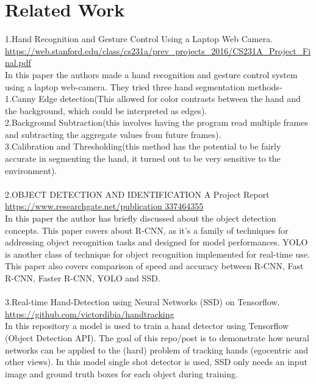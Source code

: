 \documentclass[12pt]{article}
\begin{document}
\section{Related Work}
1.Hand Recognition and Gesture Control Using a Laptop Web Camera.\\
\url{https://web.stanford.edu/class/cs231a/prev_projects_2016/CS231A_Project_Final.pdf}\\
In this paper the authors made a hand recognition and gesture control system using a laptop web-camera. They tried three hand segmentation methods- \\
1.Canny Edge detection(This allowed for color contrasts between
the hand and the background, which could be interpreted
as edges).\\
2.Background Subtraction(this involves having the program
read multiple frames and subtracting the aggregate values
from future frames).\\
3.Calibration and Thresholding(this method has the potential to be fairly accurate in segmenting the hand, it turned out to be very sensitive to the environment).\\
\\
2.OBJECT DETECTION AND IDENTIFICATION A Project Report\\
\url{https://www.researchgate.net/publication 337464355}\\ 
In this paper the author has briefly discussed about the object detection concepts. This paper covers about R-CNN, as it's a family of techniques for addressing object recognition tasks and designed for model performances. YOLO is another class of technique for object recognition implemented for real-time use. This paper also covers comparison of speed and accuracy between R-CNN, Fast R-CNN, Faster R-CNN, YOLO and SSD. \\ 
\\
3.Real-time Hand-Detection using Neural Networks (SSD) on Tensorflow.\\
\url{https://github.com/victordibia/handtracking}\\
In this repository a model is used to train a hand detector using Tensorflow (Object Detection API). The goal of this repo/post is to demonstrate how neural networks can be applied to the (hard) problem of tracking hands (egocentric and other views). In this model single shot detector is used, SSD only needs an input image and ground truth boxes for each object during training.\cite{1}
\end{document}
